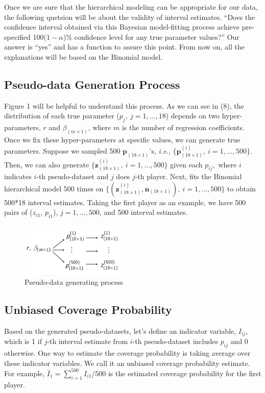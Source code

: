 \documentclass[article]{jss}
\begin{document}
Once we are sure that the hierarchical modeling can be appropriate for our data, the following quetsion will be about the validity of interval estimates. ``Does the confidence interval obtained via this Bayesian model-fitting process achieve pre-specified 100($1-\alpha$)\% confidence level for any true parameter values?'' Our answer is ``yes'' and  has a function to assure this point. From now on, all the explanations will be based on the Binomial model.

\subsection{Pseudo-data Generation Process}
Figure 1 will be helpful to understand this process. As we can see in (8), the distribution of each true parameter ($p_{j},~j=1,\ldots, 18$) depends on two hyper-parameters, $r$ and $\beta_{(m\times1)}$, where $m$ is the number of regression coefficients. Once we fix these hyper-parameters at specific values, we can generate true parameters. Suppose we sampled 500 $\textbf{p}_{(18\times1)}$'s, \emph{i.e.}, $\{\textbf{p}^{(i)}_{(18\times1)},~i=1, \ldots, 500\}$. Then, we can also generate $\{\textbf{z}^{(i)}_{(18\times1)},~i=1, \ldots, 500\}$ given each $p_{ij},$ where $i$ indicates $i$-th pseudo-dataset and $j$ does $j$-th player. Next,  fits the Binomial hierarchical model 500 times on $\{(\textbf{z}^{(i)}_{(18\times1)}, \textbf{n}_{(18 \times 1)}),~i=1, \ldots, 500\}$ to obtain 500*18 interval estimates. Taking the first player as an example, we have 500 pairs of ($z_{i1}$, $p_{i1}$), $j=1,\ldots, 500$, and 500 interval estimates.
\begin{figure}[h]
\begin{center}
\includegraphics[width=5cm]{process.png}
\caption{Pseudo-data generating process}
\end{center}
\end{figure}

\subsection{Unbiased Coverage Probability}
Based on the generated pseudo-datasets, let's define an indicator variable, $I_{ij}$, which is 1 if $j$-th interval estimate from $i$-th pseudo-dataset includes $p_{ij}$ and 0 otherwise. One way to estimate the coverage probability is taking average over these indicator variables. We call it an unbiased coverage probability estimate. For example, $\bar{I}_{1}=\sum_{i=1}^{500}I_{i1}/500$ is the estimated coverage probability for the first player.
\end{document}
